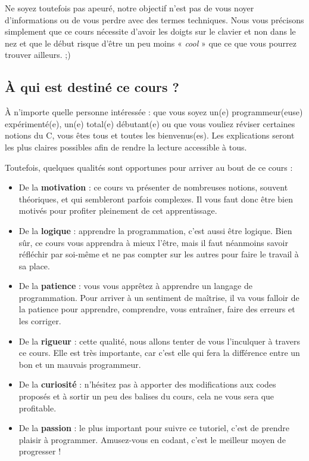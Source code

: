 Ne soyez toutefois pas apeuré, notre objectif n'est pas de vous noyer
d'informations ou de vous perdre avec des termes techniques. Nous vous
précisons simplement que ce cours nécessite d'avoir les doigts sur le
clavier et non dans le nez et que le début risque d'être un peu moins
« \emph{cool} » que ce que vous pourrez trouver ailleurs. ;)

\subsection{À qui est destiné ce cours ?}
\label{a-qui-est-destinuxe-ce-cours}

À n'importe quelle personne intéressée : que vous soyez un(e)
programmeur(euse) expérimenté(e), un(e) total(e) débutant(e) ou que
vous vouliez réviser certaines notions du C, vous êtes tous et toutes
les bienvenus(es). Les explications seront les plus claires possibles
afin de rendre la lecture accessible à tous.

Toutefois, quelques qualités sont opportunes pour arriver au bout de
ce cours :

\begin{itemize}
\item De la \textbf{motivation} : ce cours va présenter de nombreuses
  notions, souvent théoriques, et qui sembleront parfois complexes. Il
  vous faut donc être bien motivés pour profiter pleinement de cet
  apprentissage.
\item De la \textbf{logique} : apprendre la programmation, c'est aussi
  être logique. Bien sûr, ce cours vous apprendra à mieux l'être, mais
  il faut néanmoins savoir réfléchir par soi-même et ne pas compter
  sur les autres pour faire le travail à sa place.
\item De la \textbf{patience} : vous vous apprêtez à apprendre un
  langage de programmation. Pour arriver à un sentiment de maîtrise,
  il va vous falloir de la patience pour apprendre, comprendre, vous
  entraîner, faire des erreurs et les corriger.
\item De la \textbf{rigueur} : cette qualité, nous allons tenter de
  vous l'inculquer à travers ce cours. Elle est très importante, car
  c'est elle qui fera la différence entre un bon et un mauvais
  programmeur.
\item De la \textbf{curiosité} : n'hésitez pas à apporter des
  modifications aux codes proposés et à sortir un peu des balises du
  cours, cela ne vous sera que profitable.
\item De la \textbf{passion} : le plus important pour suivre ce
  tutoriel, c'est de prendre plaisir à programmer. Amusez-vous en
  codant, c'est le meilleur moyen de progresser !
\end{itemize}

